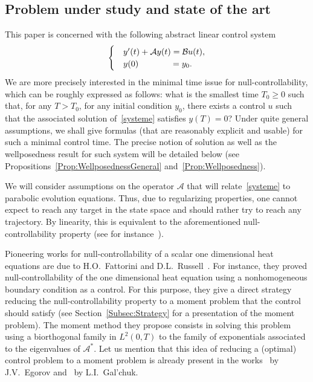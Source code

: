 \documentclass[11pt]{article}
\theoremstyle{definition}
\numberwithin{equation}{section}
\numberwithin{figure}{section}
\numberwithin{table}{section}
\newcommand\A{\mathcal{A}}
\newcommand\As{\mathcal{A}^*}
\newcommand\B{\mathcal{B}}
\begin{document}
\subsection{Problem under study and state of the art}


This paper is concerned with the following abstract linear control system
\begin{equation}\label{systeme}
\begin{cases}
&y'(t) + \A y(t) = \B u(t),
\\
&y(0) \mkern68mu= y_0.
\end{cases}
\end{equation}
We are more precisely interested in the minimal time issue for null-controllability, which can be roughly expressed as follows: what is the smallest time $T_0 \geq0$ such that, for any $T > T_0$, for any initial condition $y_0$, there exists a control $u$ such that the associated solution of~\eqref{systeme} satisfies $y(T)=0$? Under quite general assumptions, we shall give formulas (that are reasonably explicit and usable) for such a minimal control time. The precise notion of solution as well as the wellposedness result for such system will be detailed below (see Propositions~\ref{Prop:WellposednessGeneral} and~\ref{Prop:Wellposedness}).

We will consider assumptions on the operator $\A$ that will relate~\eqref{systeme} to parabolic evolution equations. Thus, due to regularizing properties, one cannot expect to reach any target in the state space and should rather try to reach any trajectory. By linearity, this is equivalent to the aforementioned null-controllability property (see for instance~\cite[Sections.~2.3 and~2.5]{CoronBook}).

Pioneering works for null-controllability of a scalar one dimensional heat equations are due to H.O.~Fattorini and D.L.~Russell~\cite{FattoriniRussell71, FattoriniRussell74}. For instance, they proved null-controllability of the one dimensional heat equation using a nonhomogeneous boundary condition as a control. For this purpose, they give a direct strategy reducing the null-controllability property to a moment problem that the control should satisfy (see Section~\ref{Subsec:Strategy} for a presentation of the moment problem). The moment method they propose consists in solving this problem using a biorthogonal family in $L^2(0,T)$ to the family of exponentials associated to the eigenvalues of $\As$. Let us mention that this idea of reducing a (optimal) control problem to a moment problem is already present in the works~\cite{Egorov63} by J.V.~Egorov and~\cite{Galchuk69} by L.I.~Gal'chuk.
\end{document}
